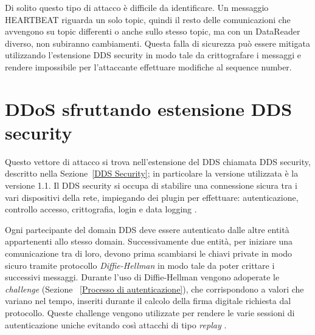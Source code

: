 Di solito questo tipo di attacco è difficile da identificare. 
Un messaggio HEARTBEAT riguarda un solo topic, quindi il resto delle
comunicazioni che avvengono su topic differenti o anche sullo stesso topic,
ma con un DataReader diverso, non subiranno cambiamenti.
Questa falla di sicurezza può essere mitigata utilizzando l'estensione
DDS security in modo tale da crittografare i messaggi e rendere 
impossibile per l'attaccante effettuare modifiche al 
sequence number. 


\section{DDoS sfruttando estensione DDS security}
Questo vettore di attacco si trova nell'estensione del DDS chiamata
DDS security, descritto nella Sezione~\ref{DDS Security}; 
in particolare la versione utilizzata è la versione 1.1.
Il DDS security si occupa di stabilire una
connessione sicura tra i vari dispositivi della rete, impiegando 
dei plugin per effettuare: autenticazione, controllo accesso, crittografia,
login e data logging \cite{ddssecurity1.1}.

Ogni partecipante del domain DDS deve essere autenticato
dalle altre entità appartenenti allo stesso domain.
Successivamente due entità,
per iniziare una comunicazione tra di loro, devono prima
scambiarsi le chiavi private
in modo
sicuro tramite protocollo \textit{Diffie-Hellman} in modo tale da poter 
crittare i successivi
messaggi. Durante l'uso di Diffie-Hellman vengono adoperate
le \textit{challenge} (Sezione ~\ref{Processo di autenticazione}), 
che corrispondono a valori che variano nel tempo, 
inseriti durante il calcolo
della firma digitale richiesta dal protocollo. 
Queste challenge vengono utilizzate per rendere le varie sessioni 
di autenticazione uniche evitando così attacchi di tipo \textit{replay}
\cite{DBLP:conf/asiaccs/WangLG24}.



